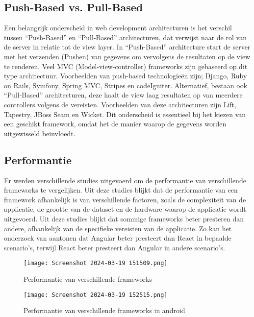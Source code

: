 \subsection*{Push-Based vs. Pull-Based}%
Een belangrijk onderscheid in web development architecturen is het verschil
tussen ``Push-Based'' en ``Pull-Based'' architecturen, dat verwijst naar de rol
van de server in relatie tot de view layer.\autocite{Lomas2022} 
\bigbreak
In ``Push-Based'' architecture start de server met het verzenden (Pushen) van
gegevens om vervolgens de resultaten op de view te renderen. Veel MVC
(Model-view-controller) frameworks zijn gebaseerd op dit type architectuur.
Voorbeelden van push-based technologieën zijn; Django, Ruby on Rails, Symfony,
Spring MVC, Stripes en codeIgniter. \bigbreak Alternatief, bestaan ook
``Pull-Based'' architecturen, deze haalt de view laag resultaten op van
meerdere controllers volgens de vereisten. Voorbeelden van deze architecturen
zijn Lift, Tapestry, JBoss Seam en Wicket.
\bigbreak
Dit onderscheid is
essentieel bij het kiezen van een geschikt framework, omdat het de manier
waarop de gegevens worden uitgewisseld beïnvloedt.


\subsection*{Performantie}%
Er werden verschillende studies uitgevoerd om de performantie van verschillende frameworks te vergelijken. Uit deze studies blijkt dat de performantie van een framework afhankelijk is van verschillende factoren, zoals de complexiteit van de applicatie, de grootte van de dataset en de hardware waarop de applicatie wordt uitgevoerd. Uit deze studies blijkt dat sommige frameworks beter presteren dan andere, afhankelijk van de specifieke vereisten van de applicatie. Zo kan het onderzoek van \textcite{DeNeve2021} aantonen dat Angular beter presteert dan React in bepaalde scenario's, terwijl React beter presteert dan Angular in andere scenario's.




\begin{figure}[h]
    \centering
    \texttt{[image: Screenshot 2024-03-19 151509.png]}
    \caption{Performantie van verschillende frameworks}
    \label{fig:Performantie}
\end{figure}

\begin{figure}[h]
    \centering
    \texttt{[image: Screenshot 2024-03-19 152515.png]}
    \caption{Performantie van verschillende frameworks in android}
    \label{fig:PerformantieAndroid}
\end{figure}

